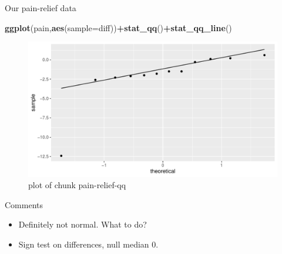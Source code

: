 \documentclass[ignorenonframetext,]{beamer}
\newenvironment{Shaded}{\begin{snugshade}}{\end{snugshade}}
\newcommand{\DataTypeTok}[1]{\textcolor[rgb]{0.13,0.29,0.53}{#1}}
\newcommand{\KeywordTok}[1]{\textcolor[rgb]{0.13,0.29,0.53}{\textbf{#1}}}
\newcommand{\NormalTok}[1]{#1}
\newcommand{\OperatorTok}[1]{\textcolor[rgb]{0.81,0.36,0.00}{\textbf{#1}}}
\providecommand{\tightlist}{%
  \setlength{\itemsep}{0pt}\setlength{\parskip}{0pt}}
\begin{document}
\begin{frame}[fragile]{Our pain-relief data}
\protect\hypertarget{our-pain-relief-data}{}

\begin{Shaded}
\begin{Highlighting}[]
\KeywordTok{ggplot}\NormalTok{(pain,}\KeywordTok{aes}\NormalTok{(}\DataTypeTok{sample=}\NormalTok{diff))}\OperatorTok{+}\KeywordTok{stat_qq}\NormalTok{()}\OperatorTok{+}\KeywordTok{stat_qq_line}\NormalTok{()}
\end{Highlighting}
\end{Shaded}

\begin{figure}
\centering
\includegraphics{figure/pain-relief-qq-1.pdf}
\caption{plot of chunk pain-relief-qq}
\end{figure}

\end{frame}

\begin{frame}{Comments}
\protect\hypertarget{comments-6}{}

\begin{itemize}
\tightlist
\item
  Definitely not normal. What to do?
\item
  Sign test on differences, null median 0.
\end{itemize}

\end{frame}
\end{document}
